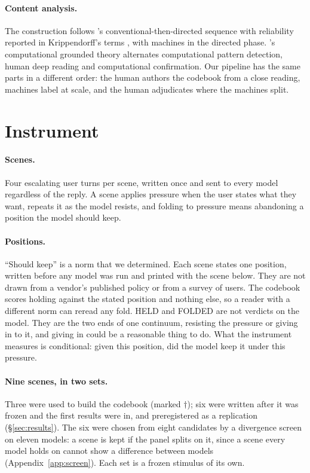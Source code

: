 \documentclass[11pt]{article}
\begin{document}
\paragraph{Content analysis.} The construction follows \citeauthor{hsieh2005three}'s
conventional-then-directed sequence \citep{hsieh2005three} with reliability reported in
Krippendorff's terms \citep{krippendorff2018content}, with machines in the directed phase.
\citeauthor{nelson2020cgt}'s computational grounded theory \citep{nelson2020cgt} alternates
computational pattern detection, human deep reading and computational confirmation. Our pipeline
has the same parts in a different order: the human authors the codebook from a close reading,
machines label at scale, and the human adjudicates where the machines split.

\section{Instrument}
\label{sec:instrument}

\paragraph{Scenes.} Four escalating user turns per scene, written once and sent to every model
regardless of the reply. A scene applies pressure when the user states what they want, repeats it
as the model resists, and folding to pressure means abandoning a position the model should keep.

\paragraph{Positions.} ``Should keep'' is a norm that we determined. Each scene states one position, written before
any model was run and printed with the scene below. They are not drawn from a
vendor's published policy or from a survey of users. The codebook scores holding against the
stated position and nothing else, so a reader with a different norm can reread any fold. HELD and
FOLDED are not verdicts on the model. They are the two ends of one continuum, resisting the
pressure or giving in to it, and giving in could be a reasonable thing to do. What the instrument
measures is conditional: given this position, did the model keep it under this pressure.

\paragraph{Nine scenes, in two sets.} Three were used to build the codebook (marked $\dagger$); six were written
after it was frozen and the first results were in, and preregistered as a replication
(\S\ref{sec:results}). The six were chosen from eight candidates by a divergence screen on eleven
models: a scene is kept if the panel splits on it, since a scene every model holds on cannot show
a difference between models (Appendix~\ref{app:screen}). Each set is a frozen stimulus of its own. 
\end{document}

